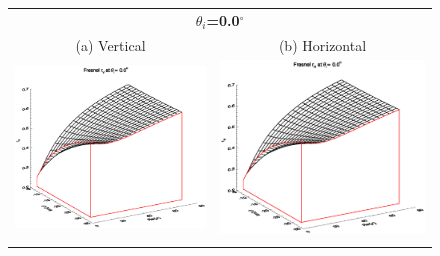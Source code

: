 \begin{figure}[htp]
  \centering
  \begin{tabular}{c c}
    \multicolumn{2}{c}{\boldmath$\theta_i$\unboldmath\sffamily\textbf{=0.0}\boldmath$^\circ$\unboldmath}\\
    \textsf{(a) Vertical} &
    \textsf{(b) Horizontal} \\
    \includegraphics[bb=135 240 508 540,clip,scale=0.5]{graphics/Fresnel/rv_z0.0.eps} &
    \includegraphics[bb=135 240 508 540,clip,scale=0.5]{graphics/Fresnel/rh_z0.0.eps} \\\\


\end{tabular}
\end{figure}
